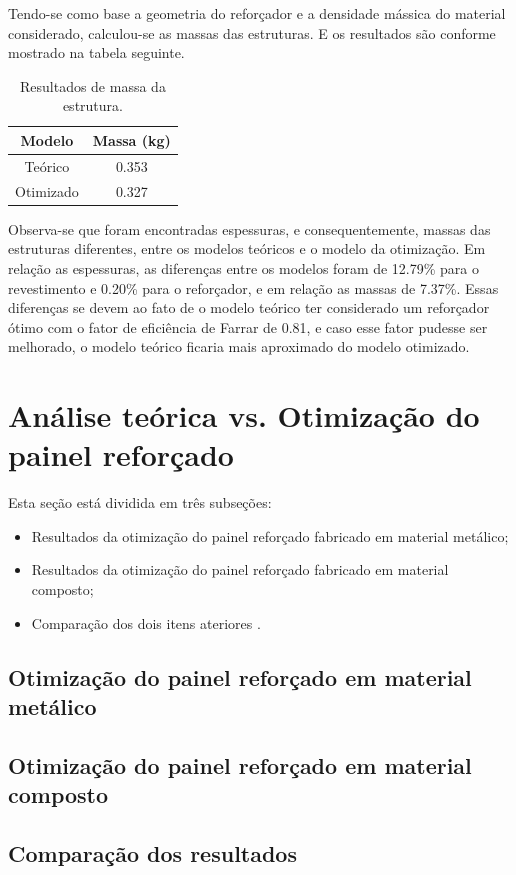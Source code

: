 Tendo-se como base a geometria do reforçador e a densidade mássica do material considerado, calculou-se as massas das estruturas. E os resultados são conforme mostrado na tabela seguinte.

\begin{table}[h]
\centering
\begin{tabular}{cc}
\toprule
Modelo & Massa (kg) \\ \midrule
Teórico & 0.353\\
Otimizado & 0.327\\
\bottomrule
\end{tabular}
\caption{Resultados de massa da estrutura.}
\label{tbl:result2_metalico}
\end{table}

Observa-se que foram encontradas espessuras, e consequentemente, massas das estruturas diferentes, entre os modelos teóricos e o modelo da otimização.
Em relação as espessuras, as diferenças entre os modelos foram de 12.79\% para o revestimento e 0.20\% para o reforçador, e em relação as massas de 7.37\%. Essas diferenças se devem ao fato de o modelo teórico ter considerado um reforçador ótimo com o fator de eficiência de Farrar de 0.81, e caso esse fator pudesse ser melhorado, o modelo teórico ficaria mais aproximado do modelo otimizado.

\section{Análise teórica vs. Otimização do painel reforçado}
Esta seção está dividida em três subseções:
\begin{itemize}
\item Resultados da otimização do painel reforçado fabricado em material metálico;
\item Resultados da otimização do painel reforçado fabricado em material composto;
\item Comparação dos dois itens ateriores .
\end{itemize}

\subsection{Otimização do painel reforçado em material metálico}

\subsection{Otimização do painel reforçado em material composto}

\subsection{Comparação dos resultados}
